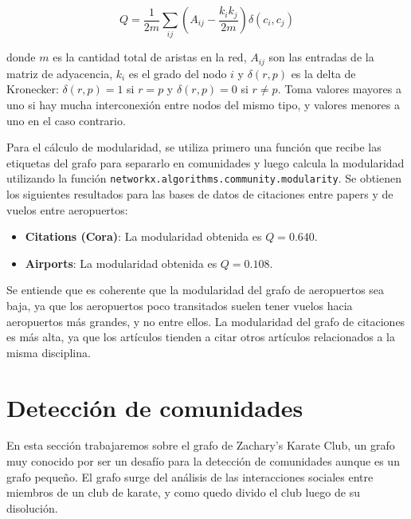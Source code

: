\documentclass{article}
\begin{document}
$$Q = \frac{1}{2m} \sum_{ij} \left(A_{ij} -\frac{k_ik_j}{2m} \right)\delta(c_i,c_j)$$

donde $m$ es la cantidad total de aristas en la red, $A_{ij}$ son las entradas de la matriz de adyacencia, $k_i$ es el grado del nodo $i$ y $\delta(r,p)$ es la delta de Kronecker: $\delta(r,p) = 1$ si $r=p$ y $\delta(r,p) = 0$ si $r\neq p$. Toma valores mayores a uno si hay mucha interconexión entre nodos del mismo tipo, y valores menores a uno en el caso contrario.


Para el cálculo de modularidad, se utiliza primero una función que recibe las etiquetas del grafo para separarlo en comunidades y luego calcula la modularidad utilizando la función \verb|networkx.algorithms.community.modularity|. Se obtienen los siguientes resultados para las bases de datos de citaciones entre papers y de vuelos entre aeropuertos:
\begin{itemize}
    \item \textbf{Citations (Cora)}: La modularidad obtenida es $Q = 0.640$.
    \item \textbf{Airports}: La modularidad obtenida es $Q = 0.108$.
\end{itemize}

Se entiende que es coherente que la modularidad del grafo de aeropuertos sea baja, ya que los aeropuertos poco transitados suelen tener vuelos hacia aeropuertos más grandes, y no entre ellos. La modularidad del grafo de citaciones es más alta, ya que los artículos tienden a citar otros artículos relacionados a la misma disciplina.

\section{Detección de comunidades} \label{sec: comunidades}

En esta sección trabajaremos sobre el grafo de Zachary's Karate Club, un grafo muy conocido por ser un desafío para la detección de comunidades aunque es un grafo pequeño. El grafo surge del análisis de las interacciones sociales entre miembros de un club de karate, y como quedo divido  el club luego de su disolución.
\end{document}
